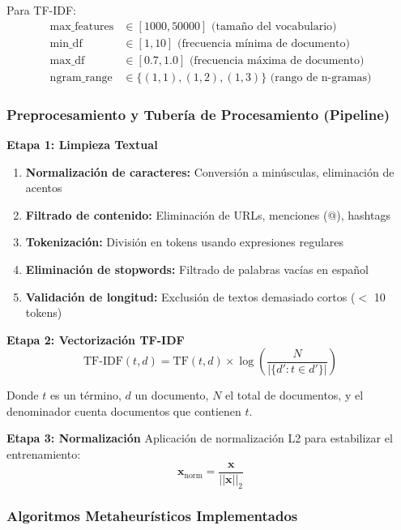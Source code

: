 Para TF-IDF:
\begin{align}
\text{max\_features} &\in [1000, 50000] \text{ (tamaño del vocabulario)} \\
\text{min\_df} &\in [1, 10] \text{ (frecuencia mínima de documento)} \\
\text{max\_df} &\in [0.7, 1.0] \text{ (frecuencia máxima de documento)} \\
\text{ngram\_range} &\in \{(1,1), (1,2), (1,3)\} \text{ (rango de n-gramas)}
\end{align}

\subsubsection{Preprocesamiento y Tubería de Procesamiento (Pipeline)}

\textbf{Etapa 1: Limpieza Textual}
\begin{enumerate}
    \item \textbf{Normalización de caracteres:} Conversión a minúsculas, eliminación de acentos
    \item \textbf{Filtrado de contenido:} Eliminación de URLs, menciones (@), hashtags
    \item \textbf{Tokenización:} División en tokens usando expresiones regulares
    \item \textbf{Eliminación de stopwords:} Filtrado de palabras vacías en español
    \item \textbf{Validación de longitud:} Exclusión de textos demasiado cortos ($<$ 10 tokens)
\end{enumerate}

\textbf{Etapa 2: Vectorización TF-IDF}
\begin{equation}
\text{TF-IDF}(t,d) = \text{TF}(t,d) \times \log\left(\frac{N}{|\{d' : t \in d'\}|}\right)
\end{equation}

Donde $t$ es un término, $d$ un documento, $N$ el total de documentos, y el denominador cuenta documentos que contienen $t$.

\textbf{Etapa 3: Normalización}
Aplicación de normalización L2 para estabilizar el entrenamiento:
\begin{equation}
\mathbf{x}_{\text{norm}} = \frac{\mathbf{x}}{||\mathbf{x}||_2}
\end{equation}

\subsubsection{Algoritmos Metaheurísticos Implementados}

